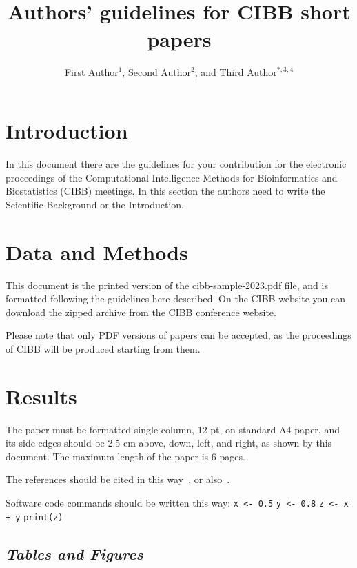 \documentclass[12pt,a4paper]{cibb}
\title{\Large $\ $\\ \bf Authors' guidelines for CIBB short papers}
\author{\large First Author$^1$, Second Author$^{2}$, and Third Author$^{*,3,4}$}
\begin{document}
\thispagestyle{myheadings}
\pagestyle{myheadings}



\section{\bf Introduction}
\label{sec:SCIENTIFIC-BACKGROUND}

In  this   document  there  are  the  guidelines   for  your  contribution
for the electronic proceedings of the Computational Intelligence Methods for Bioinformatics and Biostatistics (CIBB) meetings. 
In this section the authors need to write the Scientific Background or the Introduction.


\section{\bf Data and Methods}
\label{sec:DATA-AND-METHODS}


This document is  the printed version of the cibb-sample-2023.pdf file, and
is formatted following the guidelines here described. On the CIBB website
 you can download the  zipped
archive from the CIBB conference website.


Please note that only PDF versions of papers can be accepted, as the
proceedings of CIBB will be produced starting  from them.


\section{\bf Results}
\label{sec:RESULTS}

The paper  must be formatted  single column, 12 pt,  on standard A4 paper, and its side edges should be 2.5 cm above, down, left, and right, as shown by this document. The maximum length of  the paper is 6 pages.

The references   should   be   cited   in   this   way~\cite{domingos2012few,powell2020tried},   or also~\cite{vcuklina2020review,hansen2014scientific,WWW-GO}.

Software code commands should be written this way: 
\newline
\texttt{x <- 0.5} \newline
\texttt{y <- 0.8} \newline
\texttt{z <- x + y} \newline
\texttt{print(z)} \newline


\subsection{\bf \it Tables and Figures}
\label{sec:TABLES-AND-FIGURES}
\end{document}
